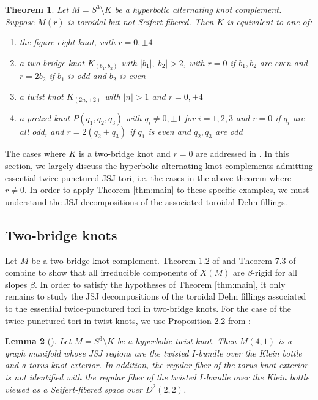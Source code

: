\documentclass{article}
\theoremstyle{plain}
\newtheorem{theorem}{Theorem}[section]
\theoremstyle{definition}
\theoremstyle{plain}
\theoremstyle{plain}
\theoremstyle{plain}
\newtheorem{lemma}[theorem]{Lemma}
\theoremstyle{remark}
\theoremstyle{remark}
\theoremstyle{plain}
\theoremstyle{plain}
\begin{document}
\begin{theorem}\cite{IchiharaMasai}\label{thm:ichiharamasai}
Let $M = S^3 \setminus K$ be a hyperbolic alternating knot complement. Suppose $M(r)$ is toroidal but not Seifert-fibered. Then $K$ is equivalent to one of:
\begin{enumerate}
	\item the figure-eight knot, with $r = 0, \pm 4$
	\item a two-bridge knot $K_{(b_1, b_2)}$ with $|b_1|, |b_2| > 2$, with $r = 0$ if $b_1, b_2$ are even and $r = 2b_2$ if $b_1$ is odd and $b_2$ is even
	\item a twist knot $K_{(2n, \pm 2)}$ with $|n| > 1$ and $r = 0, \pm 4$
	\item a pretzel knot $P(q_1, q_2, q_3)$ with $q_i \neq 0, \pm 1$ for $i = 1, 2, 3$ and $r = 0$ if $q_i$ are all odd, and $r = 2(q_2 + q_3)$ if $q_1$ is even and $q_2, q_3$ are odd
\end{enumerate}
\end{theorem}

The cases where $K$ is a two-bridge knot and $r = 0$ are addressed in \cite{Wang}. In this section, we largely discuss the hyperbolic alternating knot complements admitting essential twice-punctured JSJ tori, i.e. the cases in the above theorem where $r \neq 0$. In order to apply Theorem \ref{thm:main} to these specific examples, we must understand the JSJ decompositions of the associated toroidal Dehn fillings.

\subsection{Two-bridge knots}

Let $M$ be a two-bridge knot complement. Theorem 1.2 of \cite{Macasieb2009OnCV} and Theorem 7.3 of \cite{Petersen2014GonalityAG} combine to show that all irreducible components of $X(M)$ are $\beta$-rigid for all slopes $\beta$. In order to satisfy the hypotheses of Theorem \ref{thm:main}, it only remains to study the JSJ decompositions of the toroidal Dehn fillings associated to the essential twice-punctured tori in two-bridge knots. For the case of the twice-punctured tori in twist knots, we use Proposition 2.2 from \cite{Teragaito}:

\begin{lemma}[\cite{Teragaito}]\label{lma:teragaito}
Let $M = S^3 \setminus K$ be a hyperbolic twist knot. Then $M(4, 1)$ is a graph manifold whose JSJ regions are the twisted $I$-bundle over the Klein bottle and a torus knot exterior. In addition, the regular fiber of the torus knot exterior is not identified with the regular fiber of the twisted $I$-bundle over the Klein bottle viewed as a Seifert-fibered space over $D^2(2, 2)$. 
\end{lemma}
\end{document}
